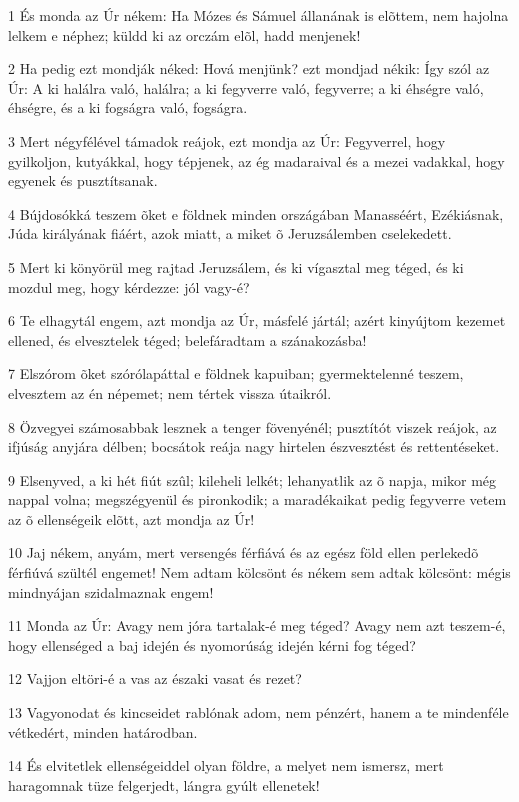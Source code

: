 \par 1 És monda az Úr nékem: Ha Mózes és  Sámuel állanának is elõttem, nem hajolna lelkem e néphez; küldd ki az orczám elõl, hadd menjenek!
\par 2 Ha pedig ezt mondják néked: Hová menjünk? ezt mondjad nékik: Így szól az Úr: A ki halálra való, halálra; a ki fegyverre való, fegyverre; a ki éhségre való, éhségre, és a ki fogságra való, fogságra.
\par 3 Mert négyfélével támadok reájok, ezt mondja az Úr: Fegyverrel, hogy gyilkoljon, kutyákkal, hogy tépjenek, az ég madaraival és a mezei vadakkal, hogy egyenek és pusztítsanak.
\par 4 Bújdosókká teszem õket e földnek minden országában Manasséért, Ezékiásnak, Júda királyának fiáért, azok miatt, a miket õ Jeruzsálemben cselekedett.
\par 5 Mert ki könyörül meg rajtad Jeruzsálem, és ki vígasztal meg téged, és ki mozdul meg, hogy kérdezze: jól vagy-é?
\par 6 Te elhagytál engem, azt mondja az Úr, másfelé jártál; azért kinyújtom kezemet ellened, és elvesztelek téged; belefáradtam a  szánakozásba!
\par 7 Elszórom õket szórólapáttal e földnek kapuiban; gyermektelenné teszem, elvesztem az én népemet; nem tértek vissza útaikról.
\par 8 Özvegyei számosabbak lesznek a tenger fövenyénél; pusztítót viszek reájok, az ifjúság anyjára délben; bocsátok reája nagy hirtelen észvesztést és rettentéseket.
\par 9 Elsenyved, a ki hét fiút szûl; kileheli lelkét; lehanyatlik az õ napja, mikor még nappal volna; megszégyenül és pironkodik; a maradékaikat pedig fegyverre vetem az õ ellenségeik elõtt, azt mondja az Úr!
\par 10 Jaj nékem, anyám, mert versengés férfiává és az egész föld ellen perlekedõ férfiúvá szültél engemet! Nem adtam kölcsönt és nékem sem adtak kölcsönt: mégis mindnyájan szidalmaznak engem!
\par 11 Monda az Úr: Avagy nem jóra tartalak-é meg téged? Avagy nem azt teszem-é, hogy ellenséged a baj idején és nyomorúság idején kérni fog téged?
\par 12 Vajjon eltöri-é a vas az északi vasat és rezet?
\par 13 Vagyonodat és kincseidet rablónak adom, nem pénzért, hanem a te mindenféle vétkedért, minden határodban.
\par 14 És elvitetlek ellenségeiddel olyan földre, a melyet nem ismersz, mert haragomnak tüze felgerjedt, lángra gyúlt ellenetek!
